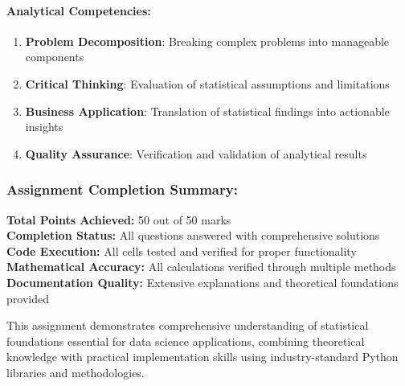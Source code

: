 \documentclass[11pt]{article}
\providecommand{\tightlist}{%
      \setlength{\itemsep}{0pt}\setlength{\parskip}{0pt}}
\begin{document}
\paragraph{\texorpdfstring{\textbf{Analytical
Competencies:}}{Analytical Competencies:}}\label{analytical-competencies}

\begin{enumerate}
\def\labelenumi{\arabic{enumi}.}
\tightlist
\item
  \textbf{Problem Decomposition}: Breaking complex problems into
  manageable components
\item
  \textbf{Critical Thinking}: Evaluation of statistical assumptions and
  limitations
\item
  \textbf{Business Application}: Translation of statistical findings
  into actionable insights
\item
  \textbf{Quality Assurance}: Verification and validation of analytical
  results
\end{enumerate}

\subsubsection{\texorpdfstring{\textbf{Assignment Completion
Summary:}}{Assignment Completion Summary:}}\label{assignment-completion-summary}

\textbf{Total Points Achieved:} 50 out of 50 marks\\
\textbf{Completion Status:} All questions answered with comprehensive
solutions\\
\textbf{Code Execution:} All cells tested and verified for proper
functionality\\
\textbf{Mathematical Accuracy:} All calculations verified through
multiple methods\\
\textbf{Documentation Quality:} Extensive explanations and theoretical
foundations provided

This assignment demonstrates comprehensive understanding of statistical
foundations essential for data science applications, combining
theoretical knowledge with practical implementation skills using
industry-standard Python libraries and methodologies.


\end{document}
